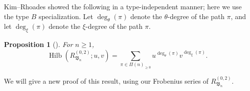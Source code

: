 \documentclass[12pt]{amsart}
\theoremstyle{plain}
\newtheorem{proposition}[theorem]{Proposition}
\theoremstyle{definition}
\DeclareMathOperator{\Hilb}{Hilb}
\begin{document}
Kim--Rhoades showed the following in a type-independent manner; here we use the type $B$ specialization. Let $\deg_\theta(\pi)$ denote the $\theta$-degree of the path $\pi$, and let $\deg_\xi(\pi)$ denote the $\xi$-degree of the path $\pi$.

\begin{proposition}[{\cite[Corollary 5.4]{MR4381935}}]\label{prop:KR-Hilb}
    For $n \geq 1$,
    \begin{equation}
        \Hilb(R_{\mathfrak{B}_n}^{(0,2)} ; u,v) = \sum_{\pi \in \Pi(n)_{\geq 0}} u^{\deg_\theta(\pi)} v^{\deg_\xi(\pi)}.
    \end{equation}
\end{proposition}

We will give a new proof of this result, using our Frobenius series of $R_{\mathfrak{B}_n}^{(0,2)}$.
\end{document}
